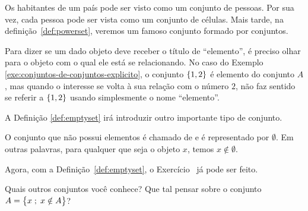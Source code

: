 \begin{example}
\label{exe:conjuntos-de-conjuntos-implicito}
Os habitantes de um país pode ser visto como um conjunto de pessoas.
Por sua vez, cada pessoa pode ser vista como um conjunto de células.
Mais tarde, na definição~\ref{def:powerset}, veremos um famoso conjunto formado por conjuntos.
\end{example}


Para dizer se um dado objeto deve receber o título de ``elemento'', é preciso olhar para o objeto com o qual ele está se relacionando. 
No caso do Exemplo \ref{exe:conjuntos-de-conjuntos-explicito}, o conjunto $\left\{ 1,2\right\}$ é elemento do conjunto $A$, mas quando o interesse se volta à sua relação com o número $2$, não faz sentido se referir a $\left\{ 1,2\right\}$ usando simplesmente o nome ``elemento''.

A Definição \ref{def:emptyset} irá introduzir outro importante tipo de conjunto.

\begin{definition}
\label{def:emptyset}
O conjunto que não possui elementos é chamado de  e é representado por $\emptyset$.
Em outras palavras, para qualquer que seja o objeto $x$, temos $x \notin \emptyset$.
\end{definition}

Agora, com a Definição~\ref{def:emptyset}, o Exercício~ já pode ser feito.

\begin{example}
Quais outros conjuntos você conhece? Que tal pensar sobre o conjunto $A = \left\{ x \;;\; x \notin A\right\}$?
\end{example}


